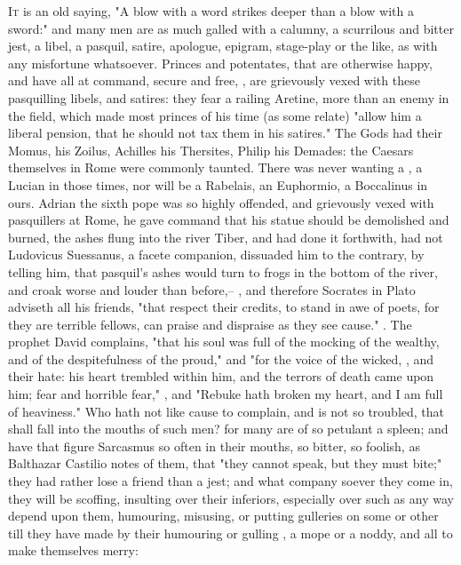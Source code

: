 \lettrine{I}{t} is an old saying, "A blow with a word
strikes deeper than a blow with a sword:" and many men are as much galled with
a calumny, a scurrilous and bitter jest, a libel, a pasquil, satire, apologue,
epigram, stage-play or the like, as with any misfortune whatsoever. Princes and
potentates, that are otherwise happy, and have all at command, secure and free,
, are grievously vexed with
these pasquilling libels, and satires: they fear a railing
Aretine, more than an enemy in the field, which made most
princes of his time (as some relate) "allow him a liberal pension, that he
should not tax them in his satires." The Gods had their
Momus, \Homer{} his Zoilus, Achilles his Thersites, Philip his Demades: the
Caesars themselves in Rome were commonly taunted. There was never wanting a
\Petronius, a Lucian in those times, nor will be a Rabelais, an Euphormio, a
Boccalinus in ours. Adrian the sixth pope was so highly
offended, and grievously vexed with pasquillers at Rome, he gave command that
his statue should be demolished and burned, the ashes flung into the river
Tiber, and had done it forthwith, had not Ludovicus Suessanus, a facete
companion, dissuaded him to the contrary, by telling him, that pasquil's ashes
would turn to frogs in the bottom of the river, and croak worse and louder than
before,-- , and therefore
Socrates in Plato adviseth all his friends, "that respect
their credits, to stand in awe of poets, for they are terrible fellows, can
praise and dispraise as they see cause." . The prophet David complains,  "that his
soul was full of the mocking of the wealthy, and of the despitefulness of the
proud," and  "for the voice of the wicked, \etc{},
and their hate: his heart trembled within him, and the terrors of death came
upon him; fear and horrible fear," \etc{}, and 
"Rebuke hath broken my heart, and I am full of heaviness." Who hath not like
cause to complain, and is not so troubled, that shall fall into the mouths of
such men? for many are of so petulant a spleen; and have
that figure Sarcasmus so often in their mouths, so bitter, so foolish, as
Balthazar Castilio notes of them, that "they cannot speak,
but they must bite;" they had rather lose a friend than a jest; and what
company soever they come in, they will be scoffing, insulting over their
inferiors, especially over such as any way depend upon them, humouring,
misusing, or putting gulleries on some or other till they have made by their
humouring or gulling , a mope or a
noddy, and all to make themselves merry:

